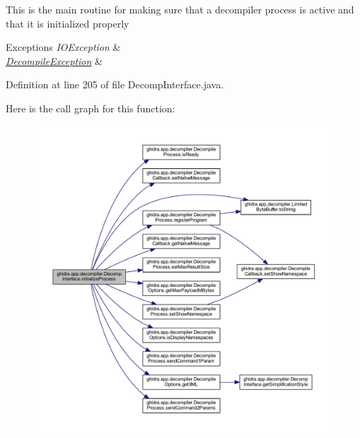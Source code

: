 This is the main routine for making sure that a decompiler process is active and that it is initialized properly 
\begin{DoxyExceptions}{Exceptions}
{\em I\+O\+Exception} & \\
\hline
{\em \mbox{\hyperlink{classghidra_1_1app_1_1decompiler_1_1_decompile_exception}{Decompile\+Exception}}} & \\
\hline
\end{DoxyExceptions}


Definition at line 205 of file Decomp\+Interface.\+java.

Here is the call graph for this function\+:
\nopagebreak
\begin{figure}[H]
\begin{center}
\leavevmode
\includegraphics[width=350pt]{classghidra_1_1app_1_1decompiler_1_1_decomp_interface_a6bd1adef30f49c5f74d95619330c2325_cgraph}
\end{center}
\end{figure}
\mbox{\label{classghidra_1_1app_1_1decompiler_1_1_decomp_interface_a94b9fdc33332c1a8f1af70a2957408a6}} 
